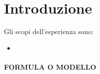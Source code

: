 \section{Introduzione}

\noindent Gli scopi dell'esperienza sono:
\begin{itemize}
    \item 
\end{itemize}

\paragraph{FORMULA O MODELLO}

